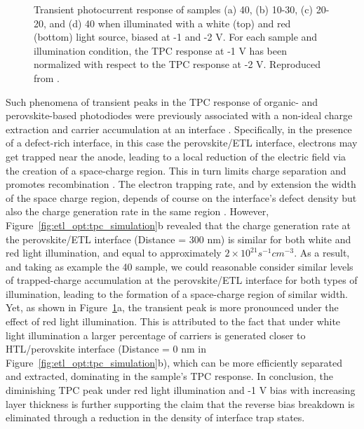 \begin{figure}[htbp]
    \caption[Transient photocurrent response of samples 40, 10-30, 20-20, or 40 as the ETL.]{Transient photocurrent response of samples (a) 40, (b) 10-30, (c) 20-20, and (d) 40 when illuminated with a white (top) and red (bottom) light source, biased at -1 and -2 V. For each sample and illumination condition, the TPC response at -1 V has been normalized with respect to the TPC response at -2 V. Reproduced from \cite{Papadopoulou2025ElectronSpeed}.}
    \label{fig:etl_opt:tpc_comparison}
\end{figure}

Such phenomena of transient peaks in the TPC response of organic- and perovskite-based photodiodes were previously associated with a non-ideal charge extraction and carrier accumulation at an interface \cite{Neophytou2019EnhancingLayer, Hwang2009Drift-diffusionCells,Mcneill2009PhotocurrentEffects}. Specifically, in the presence of a defect-rich interface, in this case the perovskite/ETL interface, electrons may get trapped near the anode, leading to a local reduction of the electric field via the creation of a space-charge region. This in turn limits charge separation and promotes recombination \cite{Mcneill2009PhotocurrentEffects}. The electron trapping rate, and by extension the width of the space charge region, depends of course on the interface's defect density but also the charge generation rate in the same region \cite{Hwang2009Drift-diffusionCells}. However, Figure~\ref{fig:etl_opt:tpc_simulation}b revealed that the charge generation rate at the perovskite/ETL interface (Distance = 300 nm) is similar for both white and red light illumination, and equal to approximately $2\times 10^{21}s^{-1}cm^{-3}$. As a result, and taking as example the 40 sample, we could reasonable consider similar levels of trapped-charge accumulation at the perovskite/ETL interface for both types of illumination, leading to the formation of a space-charge region of similar width. Yet, as shown in Figure~\ref{fig:etl_opt:tpc_comparison}a, the transient peak is more pronounced under the effect of red light illumination. This is attributed to the fact that under white light illumination a larger percentage of carriers is generated closer to HTL/perovskite interface (Distance = 0 nm in Figure~\ref{fig:etl_opt:tpc_simulation}b), which can be more efficiently separated and extracted, dominating in the sample's TPC response. In conclusion, the diminishing TPC peak under red light illumination and -1 V bias with increasing  layer thickness is further supporting the claim that the reverse bias breakdown is eliminated through a reduction in the density of interface trap states.


